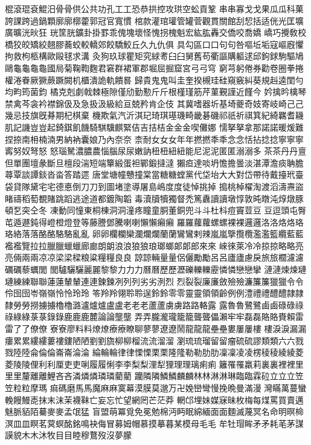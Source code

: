棍滾琨袞鯤汨⾻骨供公共功孔⼯工恐恭拱控攻珙空蚣貢鞏
串串寡⼽戈果⽠瓜科菓誇課跨過鍋顆廓廓槨藿郭冠官寬慣
棺款灌琯瓘管罐菅觀貫關館刮恝括适侊光匡壙廣曠洸炚狂
珖筐胱鑛卦掛罫乖傀塊壞怪愧拐槐魁宏紘肱轟交僑咬喬嬌
嶠巧攪敎校橋狡皎矯絞翹膠蕎蛟較轎郊餃驕鮫丘久九仇俱
具勾區⼝口句句咎嘔坵垢寇嶇廐懼拘救枸柩構歐毆毬求溝
灸狗玖球瞿矩究絿耉⾅臼舅舊苟衢謳購軀逑邱鉤銶駒驅鳩
鷗⿔龜龜龜國局菊鞠鞫麴君窘群裙軍郡堀屈掘窟宮⼸弓穹
窮芎躬倦券勸卷圈拳捲權淃眷厥獗蕨蹶闕机櫃潰詭軌饋晷
歸貴⿁鬼叫圭奎揆槻珪硅窺竅糾葵規赳逵閨勻均畇筠菌鈞
橘克剋劇戟棘極隙僅劤勤懃⽄斤根槿瑾筋芹菫覲謹近饉今
妗擒昑檎琴禁禽芩衾衿襟錦伋及急扱汲級給亘兢矜肯企伎
其冀嗜器圻基埼夔奇妓寄岐崎⼰己幾忌技旗旣朞期杞棋棄
機欺氣汽沂淇玘琦琪璂璣畸畿碁磯祁祇祈祺箕紀綺羈耆耭
肌記譏豈豈起錡錤飢饑騎騏驥麒緊佶吉拮桔⾦金金喫儺娜
懦拏拏拿那諾諾暖煖難捏捺南枏楠湳男納衲囊娘乃內奈奈
柰耐⼥女女年年撚撚秊秊念念恬拈捻捻寧寧寧寗努奴弩怒
怒瑙駑濃膿農惱腦尿尿嫩訥杻杻紐紐能尼泥泥匿匿溺溺多
茶茶丹丹亶但單團壇彖斷旦檀段湍短端簞緞蛋袒鄲鍛撻澾
獺疸達啖坍憺擔曇淡湛潭澹痰聃膽蕁覃談譚錟沓畓答踏遝
唐堂塘幢戇撞棠當糖糖螳黨代垈坮⼤大對岱帶待戴擡玳臺
袋貸隊黛宅宅德悳倒⼑刀到圖堵塗導屠島嶋度度徒悼挑掉
搗桃棹櫂淘渡滔濤燾盜睹禱稻萄覩賭跳蹈逃途道都鍍陶韜
毒瀆牘犢獨督禿篤纛讀讀墩惇敦旽暾沌焞燉豚頓乭突仝冬
凍動同憧東桐棟洞洞潼疼瞳童胴董銅兜⽃斗杜枓痘竇荳⾖
豆逗頭屯臀芚遁遯鈍得嶝橙燈登等藤謄鄧騰喇喇懶懶癩癩
羅羅蘿蘿螺螺裸裸邏邏洛洛烙烙珞珞絡落落酪酪駱駱亂亂
卵卵欄欄欒瀾爛爛蘭蘭鸞鸞剌辣嵐嵐擥攬欖濫濫籃纜藍藍
襤襤覽拉拉臘臘蠟蠟廊廊朗朗浪浪狼狼琅瑯螂郞郞郎來來
崍徠萊冷冷掠掠略略亮亮倆兩兩凉凉梁梁樑粮粱糧糧良良
諒諒輛量量侶儷勵勵呂呂廬廬慮戾旅旅櫚濾濾礪礪藜蠣閭
閭驢驪驪麗麗黎黎⼒力力曆曆歷歷瀝礫轢轢靂憐憐戀戀攣
漣漣煉煉璉璉練練聯聯蓮蓮輦輦連連鍊鍊冽列列劣劣洌烈
烈裂裂廉廉斂殮殮濂簾簾獵獵令令伶囹囹岺嶺嶺怜怜玲玲
笭羚羚翎聆聆逞鈴鈴零零靈靈領領齡例例澧禮禮醴醴隷隷
隸勞勞撈擄擄櫓櫓潞瀘爐爐盧盧⽼老老蘆蘆虜虜路路輅露
露魯魯鷺鷺⿄鹵碌碌祿祿綠綠菉菉錄錄⿅鹿鹿麓論論壟壟
弄弄朧瀧瓏籠籠聾聾儡瀨牢牢磊磊賂賂賚賴雷雷了了僚僚
寮寮廖料料燎燎療療瞭聊蓼蓼遼遼鬧⿓龍龍壘壘婁屢屢樓
樓淚淚漏漏瘻累累縷縷蔞褸鏤陋陋劉劉旒柳柳榴流流溜溜
瀏琉琉瑠留留瘤硫硫謬類類六六戮戮陸陸侖倫倫崙崙淪淪
綸輪輪律律慄慄栗栗隆隆勒勒肋肋凜凜凌凌楞稜稜綾綾菱
菱陵陵俚利利厘吏吏唎履履悧李李梨梨浬犁狸理理璃痢痢
籬罹罹羸莉裏裏裡裡⾥里里釐離離鯉吝吝潾燐燐璘璘藺藺
躪隣隣鱗鱗麟麟林林淋淋琳臨臨霖砬⽴立立笠笠粒粒摩瑪
痲碼磨⾺馬魔⿇麻寞幕漠膜莫邈万卍娩巒彎慢挽晩曼滿漫
灣瞞萬蔓蠻輓饅鰻唜抹末沫茉襪靺亡妄忘忙望網罔芒茫莽
輞邙埋妹媒寐昧枚梅每煤罵買賣邁魅脈貊陌驀⿆麥孟氓猛
盲盟萌冪覓免冕勉棉沔眄眠綿緬⾯面麵滅蔑冥名命明暝椧
溟⽫皿瞑茗蓂螟酩銘鳴袂侮冒募姆帽慕摸摹暮某模母⽑毛
牟牡瑁眸⽭矛耗芼茅謀謨貌⽊木沐牧⽬目睦穆鶩歿沒夢朦
